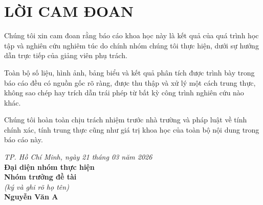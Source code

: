{\fontsize{14}{17}\selectfont
\chapter*{LỜI CAM ĐOAN}
}
Chúng tôi xin cam đoan rằng báo cáo khoa học này là kết quả của quá trình học tập và nghiên cứu nghiêm túc do chính nhóm chúng tôi thực hiện, dưới sự hướng dẫn trực tiếp của giảng viên phụ trách.

Toàn bộ số liệu, hình ảnh, bảng biểu và kết quả phân tích được trình bày trong báo cáo đều có nguồn gốc rõ ràng, được thu thập và xử lý một cách trung thực, không sao chép hay trích dẫn trái phép từ bất kỳ công trình nghiên cứu nào khác.

Chúng tôi hoàn toàn chịu trách nhiệm trước nhà trường và pháp luật về tính chính xác, tính trung thực cũng như giá trị khoa học của toàn bộ nội dung trong báo cáo này.

\vspace{1cm}
\begin{flushright}
    \textit{TP. Hồ Chí Minh, ngày 21 tháng 03 năm 2026}\\
    \textbf{Đại diện nhóm thực hiện}\\
    \textbf{Nhóm trưởng đề tài}\\
    \textit{(ký và ghi rõ họ tên)}\\
    \vspace{2cm}
    \textbf{Nguyễn Văn A}
\end{flushright}